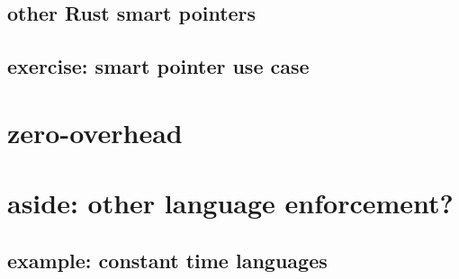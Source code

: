 
\subsection{other Rust smart pointers}


\subsection{exercise: smart pointer use case}



\section{zero-overhead}


\section{aside: other language enforcement?}


\subsection{example: constant time languages}


